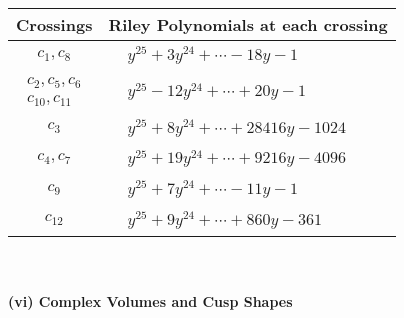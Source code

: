 \documentclass[1p]{elsarticle_modified}
\theoremstyle{definition}
\begin{document}
\begin{tabular}{m{50pt}|m{274pt}}
Crossings & \hspace{64pt}Riley Polynomials at each crossing \\
\hline $$\begin{aligned}c_{1},c_{8}\end{aligned}$$&$\begin{aligned}
&y^{25}+3 y^{24}+\cdots-18 y-1
\end{aligned}$\\
\hline $$\begin{aligned}c_{2},c_{5},c_{6}\\c_{10},c_{11}\end{aligned}$$&$\begin{aligned}
&y^{25}-12 y^{24}+\cdots+20 y-1
\end{aligned}$\\
\hline $$\begin{aligned}c_{3}\end{aligned}$$&$\begin{aligned}
&y^{25}+8 y^{24}+\cdots+28416 y-1024
\end{aligned}$\\
\hline $$\begin{aligned}c_{4},c_{7}\end{aligned}$$&$\begin{aligned}
&y^{25}+19 y^{24}+\cdots+9216 y-4096
\end{aligned}$\\
\hline $$\begin{aligned}c_{9}\end{aligned}$$&$\begin{aligned}
&y^{25}+7 y^{24}+\cdots-11 y-1
\end{aligned}$\\
\hline $$\begin{aligned}c_{12}\end{aligned}$$&$\begin{aligned}
&y^{25}+9 y^{24}+\cdots+860 y-361
\end{aligned}$\\
\hline
\end{tabular}\\~\\
\newpage\flushleft \textbf{(vi) Complex Volumes and Cusp Shapes}
\end{document}

